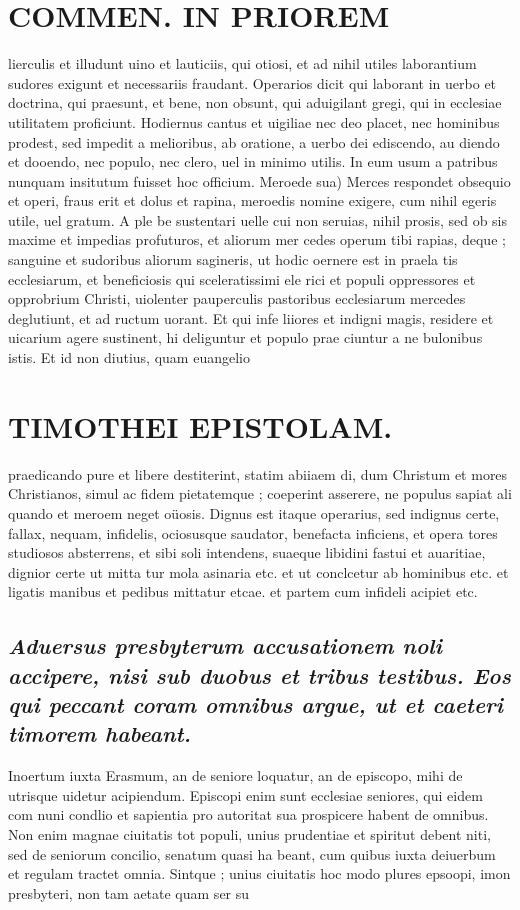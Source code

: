 \documentclass{article}
\begin{document}
\begin{pages}
\section*{COMMEN. IN PRIOREM }
\marginpar{[ p.140 ]}\pstart lierculis et illudunt uino et lauticiis, qui otiosi, et ad nihil utiles laborantium sudores exigunt et necessariis fraudant. Operarios dicit qui laborant in uerbo et doctrina, qui praesunt, et bene, non obsunt, qui aduigilant gregi, qui in ecclesiae utilitatem proficiunt. Hodiernus cantus et uigiliae nec deo placet, nec hominibus prodest, sed impedit a melioribus, ab oratione, a uerbo dei ediscendo, au diendo et dooendo, nec populo, nec clero, uel in minimo utilis. In eum usum a patribus nunquam insitutum fuisset hoc officium.  \pend\pstart Meroede sua) Merces respondet obsequio et operi, fraus erit et dolus et rapina, meroedis nomine exigere, cum nihil egeris utile, uel gratum. A ple be sustentari uelle cui non seruias, nihil prosis, sed ob sis maxime et impedias profuturos, et aliorum mer cedes operum tibi rapias, deque ; sanguine et sudoribus aliorum sagineris, ut hodic oernere est in praela tis ecclesiarum, et beneficiosis qui sceleratissimi ele rici et populi oppressores et opprobrium Christi, uiolenter pauperculis pastoribus ecclesiarum mercedes deglutiunt, et ad ructum uorant. Et qui infe liiores et indigni magis, residere et uicarium agere sustinent, hi deliguntur et populo prae ciuntur a ne bulonibus istis. Et id non diutius, quam euangelio  \pend
\section*{TIMOTHEI EPISTOLAM. }
\marginpar{[ p.141 ]}\pstart praedicando pure et libere destiterint, statim abiiaem di, dum Christum et mores Christianos, simul ac fidem pietatemque ; coeperint asserere, ne populus sapiat ali quando et meroem neget oüosis. Dignus est itaque operarius, sed indignus certe, fallax, nequam, infidelis, ociosusque saudator, benefacta inficiens, et opera tores studiosos absterrens, et sibi soli intendens, suaeque libidini fastui et auaritiae, dignior certe ut mitta tur mola asinaria etc. et ut conclcetur ab hominibus etc. et ligatis manibus et pedibus mittatur etcae. et partem cum infideli acipiet etc.  \pend
{}
{}
\subsection*{\textit{Aduersus presbyterum accusationem noli accipere, nisi sub duobus et tribus testibus. Eos qui peccant coram omnibus argue, ut et caeteri timorem habeant. }}\pstart Inoertum iuxta Erasmum, an de seniore loquatur, an de episcopo, mihi de utrisque uidetur acipiendum. Episcopi enim sunt ecclesiae seniores, qui eidem com nuni condlio et sapientia pro autoritat sua prospicere habent de omnibus. Non enim magnae ciuitatis tot populi, unius prudentiae et spiritut debent niti, sed de seniorum concilio, senatum quasi ha beant, cum quibus iuxta deiuerbum et regulam tractet omnia. Sintque ; unius ciuitatis hoc modo plures epsoopi, imon presbyteri, non tam aetate quam ser su  \pend

\end{pages}
\end{document}
